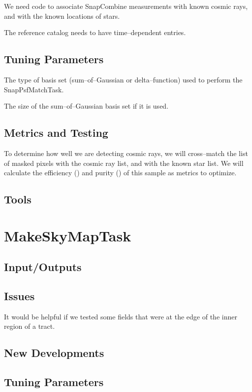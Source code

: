 \documentclass[12pt]{article}
\begin{document}
We need code to associate SnapCombine measurements with known cosmic
rays, and with the known locations of stars.

The reference catalog needs to have time--dependent entries.

\subsection{Tuning Parameters}

The type of basis set (sum--of--Gaussian or delta--function) used to
perform the SnapPsfMatchTask.

The size of the sum--of--Gaussian basis set if it is used.

\subsection{Metrics and Testing}

To determine how well we are detecting cosmic rays, we will
cross--match the list of masked pixels with the cosmic ray list, and
with the known star list.  We will calculate the efficiency () and
purity () of this sample as metrics to optimize.

\subsection{Tools}


\clearpage 
\section{MakeSkyMapTask} 

\subsection{Input/Outputs}
\subsection{Issues}
It would be helpful if we tested some fields that were at the edge of
the inner region of a tract.
\subsection{New Developments}
\subsection{Tuning Parameters}
\end{document}
